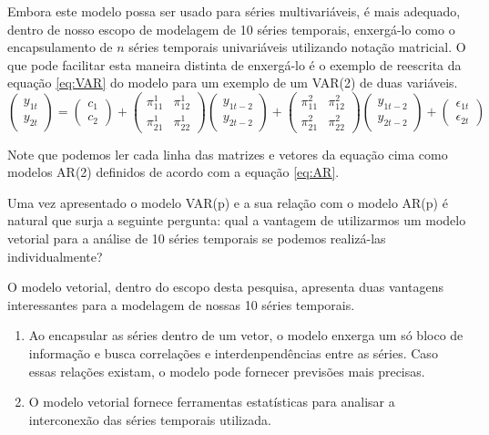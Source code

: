 \documentclass[12pt]{article}
\begin{document}
	Embora este modelo possa ser usado para séries multivariáveis, é mais adequado, dentro de nosso escopo de modelagem de 10 séries temporais, enxergá-lo como o encapsulamento de $n$ séries temporais univariáveis utilizando notação matricial. O que pode facilitar esta maneira distinta de enxergá-lo é o exemplo de reescrita da equação \ref{eq:VAR} do modelo para um exemplo de um VAR(2) de duas variáveis.
	\begin{equation*}
		\begin{pmatrix}
			y_{1t} \\
			y_{2t}
		\end{pmatrix}=
		\begin{pmatrix}
			c_{1} \\
			c_{2}
		\end{pmatrix}+
		\begin{pmatrix}
			\pi_{11}^{1} & \pi_{12}^{1}\\
			\pi_{21}^{1} & \pi_{22}^{1}
		\end{pmatrix}
		\begin{pmatrix}
			y_{1t-2} \\
			y_{2t-2}
		\end{pmatrix}+
		\begin{pmatrix}
		\pi_{11}^{2} & \pi_{12}^2\\
		\pi_{21}^{2} & \pi_{22}^2
		\end{pmatrix}
		\begin{pmatrix}
			y_{1t-2} \\
			y_{2t-2}
		\end{pmatrix}+
		\begin{pmatrix}
			\epsilon_{1t} \\
			\epsilon_{2t}
		\end{pmatrix}	
	\end{equation*}

	Note que podemos ler cada linha das matrizes e vetores da equação cima como modelos AR(2) definidos de acordo com a equação \ref{eq:AR}.
	
	Uma vez apresentado o modelo VAR(p) e a sua relação com o modelo AR(p) é natural que surja a seguinte pergunta: qual a vantagem de utilizarmos um modelo vetorial para a análise de 10 séries temporais se podemos realizá-las individualmente? 
	
	O modelo vetorial, dentro do escopo desta pesquisa, apresenta duas vantagens interessantes para a modelagem de nossas 10 séries temporais.
	\begin{enumerate}
		\item Ao encapsular as séries dentro de um vetor, o modelo enxerga um só bloco de informação e busca correlações e interdenpendências entre as séries. Caso essas relações existam, o modelo pode fornecer previsões mais precisas.
		\item O modelo vetorial fornece ferramentas estatísticas para analisar a interconexão das séries temporais utilizada. 
	\end{enumerate}
\end{document}
